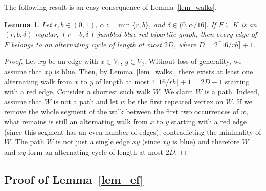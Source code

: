 \documentclass[12pt,reqno]{amsart}
\newtheorem{lemma}[theorem]{Lemma}
\theoremstyle{definition}
\begin{document}
The following result is an easy consequence of Lemma~\ref{lem_walks}.

\begin{lemma}
  \label{lem_alternating}
	Let $r, b \in (0,1)$, $\alpha := \min \{r,b\}$, and $\delta\in (0,\alpha/16]$. If $F \subseteq K$ is an $(r, b, \delta)$-regular, $(r + b, \delta)$-jumbled  blue-red bipartite graph, then every edge of $F$ belongs to an alternating cycle of length at most $2D$, where $D = 2\lceil 16/rb \rceil + 1$.
\end{lemma}
\begin{proof}
  Let $xy$ be an edge with $x\in V_1$, $y\in V_2$. Without loss of generality, we assume that $xy$ is blue. Then, by Lemma~\ref{lem_walks}, there exists at least one alternating walk from $x$ to $y$ of length at most $4\lceil 16/rb \rceil + 1 = 2D - 1$  starting with a red edge. Consider a shortest such walk $W$. We claim $W$ is a path. Indeed, assume that $W$ is not a path and let $w$ be the first repeated vertex on $W$. If we remove the whole segment of the walk between the first two occurrences of $w$, what remains is still an alternating walk from $x$ to $y$ starting with a red edge (since this segment has an even number of edges), contradicting the minimality of $W$.
  The path $W$ is not just a single edge $xy$ (since $xy$ is blue) and therefore $W$ and $xy$ form an alternating cycle of length at most $2D$.
\end{proof}



\subsection{Proof of Lemma~\ref{lem_ef}}
\label{ss_ef_proof}
\end{document}
